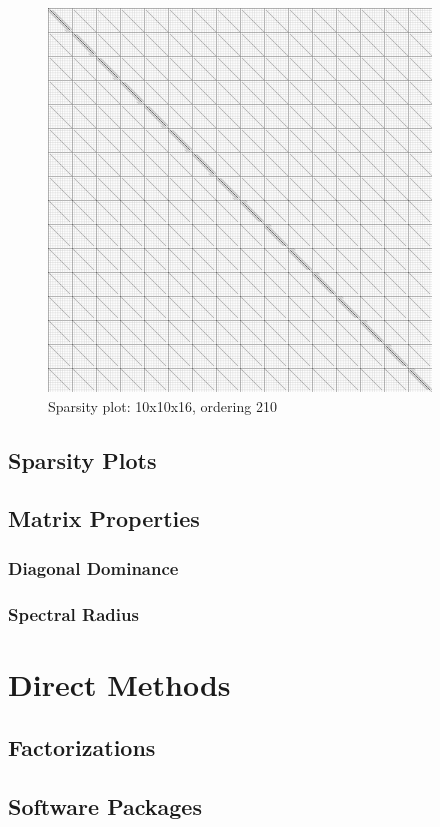 \documentclass[10pt]{article}
\begin{document}
\begin{figure}[H]
	\centering
	\includegraphics[width=4in]{../img/sparsity/int_kelp1_10x10x16_210.png}
	\caption{Sparsity plot: 10x10x16, ordering 210}
\end{figure}
\subsection{Sparsity Plots}
\subsection{Matrix Properties}
\subsubsection{Diagonal Dominance}
\subsubsection{Spectral Radius}

\section{Direct Methods}
\subsection{Factorizations}
\subsection{Software Packages}
\end{document}
